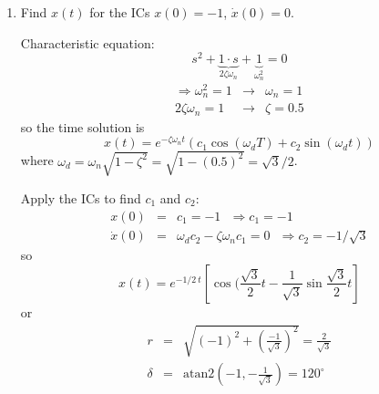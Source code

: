 \documentclass[]{article}
\begin{document}
\begin{enumerate}
 \item Find $x(t)$ for the ICs $x(0)=-1$, $\dot{x}(0)=0$.
 

Characteristic equation:
 \begin{displaymath}
s^{2}+\underbrace{1\cdot s}_{2\zeta\omega_{n}} + \underbrace{1}_{\omega_{n}^{2}} = 0
 \end{displaymath}
\begin{eqnarray}
 \Rightarrow \omega_{n}^{2} = 1 & \rightarrow & \omega_{n}=1 \nonumber \\
 2\zeta\omega_{n} = 1 & \rightarrow & \zeta=0.5 \nonumber
\end{eqnarray}
so the time solution is
\begin{displaymath}
 x(t) = e^{-\zeta\omega_{n}t}\left(c_{1}\cos(\omega_{d}T) + c_{2}\sin(\omega_{d}t)\right)
\end{displaymath}
where $\omega_{d}=\omega_{n}\sqrt{1-\zeta^{2}} = \sqrt{1-(0.5)^{2}} = \sqrt{3}/2$.

Apply the ICs to find $c_{1}$ and $c_{2}$:
\begin{eqnarray}
 x(0) & = & c_{1} = -1\ \ \ \Rightarrow c_{1}=-1 \nonumber  \\
 \dot{x}(0) & = & \omega_{d}c_{2}-\zeta\omega_{n}c_{1} = 0 \ \ \ \Rightarrow c_{2}=-1/\sqrt{3} \nonumber
\end{eqnarray}
so
\begin{displaymath}
 x(t) = e^{-1/2\ t}\left[\cos(\frac{\sqrt{3}}{2}t - \frac{1}{\sqrt{3}}\sin{\frac{\sqrt{3}}{2}t}\right]
\end{displaymath}
or
\begin{eqnarray}
 r & = & \sqrt{(-1)^{2}+(\frac{-1}{\sqrt{3}})^{2}} = \frac{2}{\sqrt{3}} \nonumber \\
 \delta & = & \text{atan2}\left(-1, -\frac{1}{\sqrt{3}}\right) = 120^{\circ} \nonumber
\end{eqnarray}


\end{enumerate}
\end{document}
